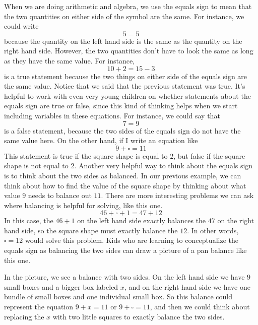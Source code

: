 \documentclass{ximera}
\begin{document}
When we are doing arithmetic and algebra, we use the equals sign to mean that the two quantities on either side of the symbol are the same. For instance, we could write
\[
5 = 5
\]
because the quantity on the left hand side is the same as the quantity on the right hand side. However, the two quantities don't have to look the same as long as they have the same value. For instance, 
\[
10 + 2 = 15 - 3
\]
is a true statement because the two things on either side of the equals sign are the same value. Notice that we said that the previous statement was true. It's helpful to work with even very young children on whether statements about the equals sign are true or false, since this kind of thinking helps when we start including variables in these equations. For instance, we could say that 
\[
7 = 9
\]
is a false statement, because the two sides of the equals sign do not have the same value here. On the other hand, if I write an equation like
\[
9 + \square = 11
\]
This statement is true if the square shape is equal to $2$, but false if the square shape is not equal to $2$. Another very helpful way to think about the equals sign is to think about the two sides as balanced. In our previous example, we can think about how to find the value of the square shape by thinking about what value $9$ needs to balance out $11$. There are more interesting problems we can ask where balancing is helpful for solving, like this one.
\[
46 + \square + 1 = 47 + 12 
\]
In this case, the $46 + 1$ on the left hand side exactly balances the $47$ on the right hand side, so the square shape must exactly balance the $12$. In other words, $\square = 12$ would solve this problem. Kids who are learning to conceptualize the equals sign as balancing the two sides can draw a picture of a pan balance like this one.
\begin{image}
\end{image}
In the picture, we see a balance with two sides. On the left hand side we have $9$ small boxes and a bigger box labeled $x$, and on the right hand side we have one bundle of small boxes and one individual small box. So this balance could represent the equation $9 + x = 11$ or $9 + \square = 11$, and then we could think about replacing the $x$ with two little squares to exactly balance the two sides.
\end{document}
